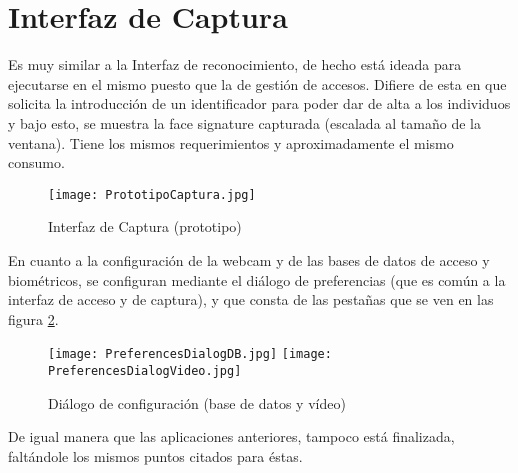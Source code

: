 \section{Interfaz de Captura}

Es muy similar a la Interfaz de reconocimiento, de hecho está ideada para ejecutarse en el mismo puesto que la de gestión de accesos. Difiere de esta en que solicita la introducción de un identificador para poder dar de alta a los individuos y bajo esto, se muestra la face signature capturada (escalada al tamaño de la ventana). Tiene los mismos requerimientos y aproximadamente el mismo consumo.

\begin{figure}[h!]
        \centering
        \texttt{[image: PrototipoCaptura.jpg]}
        \caption{Interfaz de Captura (prototipo)}
	\label{fig:captura}
\end{figure}

En cuanto a la configuración de la webcam y de las bases de datos de acceso y biométricos, se configuran mediante el diálogo de preferencias (que es común a la interfaz de acceso y de captura), y que consta de las pestañas que se ven en las figura \ref{fig:prefs_dialog}.

\begin{figure}[h!]
        \centering
        \texttt{[image: PreferencesDialogDB.jpg]}
        \texttt{[image: PreferencesDialogVideo.jpg]}
        \caption{Diálogo de configuración (base de datos y vídeo)}
	\label{fig:prefs_dialog}
\end{figure}


De igual manera que las aplicaciones anteriores, tampoco está finalizada, faltándole los mismos puntos citados para éstas.
